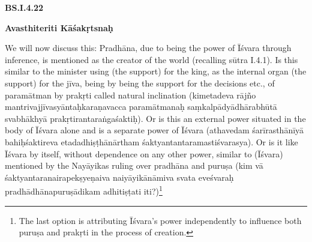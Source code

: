 \textbf{BS.I.4.22}

\textbf{Avasthiteriti Kāśakṛtsnaḥ}


We will now discuss this: Pradhāna, due to being the power of Īśvara through inference, is mentioned as the creator of the world (recalling sūtra I.4.1). Is this similar to the minister using (the support) for the king, as the internal organ (the support) for the jīva, being by being the support for the decisions etc., of paramātman by prakṛti called natural inclination (kimetadeva rājño mantrivajjīvasyāntaḥkaraṇavacca paramātmanaḥ saṃkalpādyādhārabhūtā svabhākhyā prakṛtirantaraṅgaśaktiḥ). Or is this an external power situated in the body of Īśvara alone and is a separate power of Īśvara (athavedam śarīrasthānīyā bahiḥ\-śaktireva etadadhiṣṭhānārtham śaktyantantaramastiśvarasya). Or is it like Īśvara by itself, without dependence on any other power, similar to (Īśvara) mentioned by the Nayāyikas ruling over pradhāna and puruṣa (kim vā śaktyantaranairapekṣyeṇaiva naiyāyikānāmiva svata eveśvaraḥ pradhādhānapuruṣādikam adhitiṣṭati iti?)\footnote{The last option is attributing Īśvara’s power independently to influence both puruṣa and prakṛti in the process of creation.}

